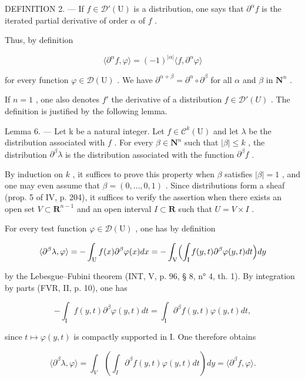 DEFINITION 2. --- If \(f \in \mathcal{D}'(\mathrm{U})\) is a distribution, one says that \(\partial^{\alpha} f\) is the iterated partial derivative of order \(\alpha\) of \(f\) .

Thus, by definition

\[
\langle \partial^ {\alpha} f, \varphi \rangle = (- 1) ^ {| \alpha |} \langle f, \partial^ {\alpha} \varphi \rangle
\]

for every function \(\varphi\in\mathcal{D}(\mathrm{U})\) . We have \(\partial^{\alpha+\beta}=\partial^{\alpha}\circ\partial^{\beta}\) for all \(\alpha\) and \(\beta\) in \(\mathbf{N}^{n}\) .

If \(n=1\) , one also denotes \(f'\) the derivative of a distribution \(f\in\mathcal{D}'(U)\) . The definition is justified by the following lemma.

Lemma 6. --- Let k be a natural integer. Let \(f \in \mathcal{C}^k(\mathrm{U})\) and let \(\lambda\) be the distribution associated with \(f\) . For every \(\beta \in \mathbf{N}^n\) such that \(|\beta| \leqslant k\) , the distribution \(\partial^\beta\lambda\) is the distribution associated with the function \(\partial^\beta f\) .

By induction on \(k\) , it suffices to prove this property when \(\beta\) satisfies \(|\beta| = 1\) , and one may even assume that \(\beta = (0, \ldots, 0, 1)\) . Since distributions form a sheaf (prop. 5 of IV, p. 204), it suffices to verify the assertion when there exists an open set \(V \subset \mathbf{R}^{n-1}\) and an open interval \(I \subset \mathbf{R}\) such that \(U = V \times I\) .

For every test function \(\varphi\in\mathcal{D}(\mathrm{U})\) , one has by definition

\[
\langle \partial^ {\beta} \lambda , \varphi \rangle = - \int_ {\mathrm{U}} f (x) \partial^ {\beta} \varphi (x) d x = - \int_ {\mathrm{V}} \Bigl (\int_ {\mathrm{I}} f (y, t) \partial^ {\beta} \varphi (y, t) d t \Bigr) d y
\]

by the Lebesgue--Fubini theorem (INT, V, p. 96, § 8, n° 4, th. 1). By integration by parts (FVR, II, p. 10), one has

\[
- \int_ {\mathrm{I}} f (y, t) \partial^ {\beta} \varphi (y, t) d t = \int_ {\mathrm{I}} \partial^ {\beta} f (y, t) \varphi (y, t) d t,
\]

since \(t \mapsto \varphi(y, t)\) is compactly supported in I. One therefore obtains

\[
\langle \partial^ {\beta} \lambda , \varphi \rangle = \int_ {V} \left(\int_ {I} \partial^ {\beta} f (y, t) \varphi (y, t) d t\right) d y = \langle \partial^ {\beta} f, \varphi \rangle .
\]


